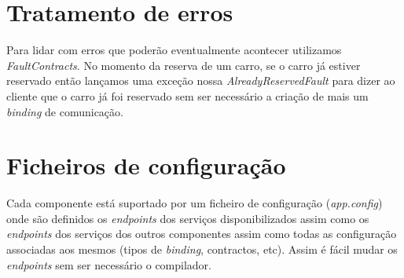 \documentclass[a4paper]{article}
\begin{document}
\section{Tratamento de erros}
Para lidar com erros que poderão eventualmente acontecer utilizamos \emph{FaultContracts}.
No momento da reserva de um carro, se o carro já estiver reservado então lançamos uma exceção nossa \emph{AlreadyReservedFault} para dizer ao cliente que o carro já foi reservado sem ser necessário a criação de mais um \emph{binding} de comunicação.

\section{Ficheiros de configuração}
Cada componente está suportado por um ficheiro de configuração (\emph{app.config}) onde são definidos os \emph{endpoints} dos serviços disponibilizados assim como os \emph{endpoints} dos serviços dos outros componentes assim como todas as configuração associadas aos mesmos (tipos de \emph{binding}, contractos, etc). Assim é fácil mudar os \emph{endpoints} sem ser necessário o compilador.
\end{document}
